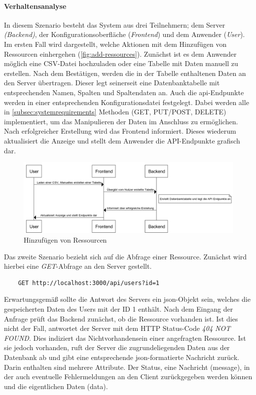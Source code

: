 \paragraph{Verhaltensanalyse} In diesem Szenario besteht das System aus drei Teilnehmern; dem Server \textit{(Backend)}, der Konfigurationsoberfläche (\textit{Frontend}) und dem Anwender (\textit{User}). Im ersten Fall wird dargestellt, welche Aktionen mit dem Hinzufügen von Ressourcen einhergehen (\autoref{fig:add-ressources}). Zunächst ist es dem Anwender möglich eine CSV-Datei hochzuladen oder eine Tabelle mit Daten manuell zu erstellen. Nach dem Bestätigen, werden die in der Tabelle enthaltenen Daten an den Server übertragen. Dieser legt seinerseit eine Datenbanktabelle mit entsprechenden Namen, Spalten und Spaltendaten an. Auch die \gls{api}-Endpunkte werden in einer entsprechenden Konfigurationsdatei festgelegt. Dabei werden alle in \autoref{subsec:systemrequirements} Methoden (GET, PUT/POST, DELETE) implementiert, um das Manipulieren der Daten im Anschluss zu ermöglichen. \\ Nach erfolgreicher Erstellung wird das Frontend informiert. Dieses wiederum aktualisiert die Anzeige und stellt dem Anwender die API-Endpunkte grafisch dar.
\begin{figure}[h]
    \centering
    \includegraphics[width=1\textwidth]{figures/seq-hinzufuegen-von-ressourcen.png}
    \caption{Hinzufügen von Ressourcen}
    \label{fig:add-ressources}
\end{figure}
Das zweite Szenario bezieht sich auf die Abfrage einer Ressource. Zunächst wird hierbei eine \textit{GET}-Abfrage an den Server gestellt.
\begin{verbatim}
    GET http://localhost:3000/api/users?id=1
\end{verbatim}
Erwartungsgemäß sollte die Antwort des Servers ein \gls{json}-Objekt sein, welches die gespeicherten Daten des Users mit der ID 1 enthält. Nach dem Eingang der Anfrage prüft das Backend zunächst, ob die Ressource vorhanden ist. Ist dies nicht der Fall, antwortet der Server mit dem HTTP Status-Code \textit{404 NOT FOUND}. Dies indiziert das Nichtvorhandensein einer angefragten Ressource. Ist sie jedoch vorhanden, ruft der Server die zugrundeliegenden Daten aus der Datenbank ab und gibt eine entsprechende \gls{json}-formatierte Nachricht zurück. Darin enthalten sind mehrere Attribute. Der Status, eine Nachricht (message), in der auch eventuelle Fehlermeldungen an den Client zurückgegeben werden können und die eigentlichen Daten (data).
